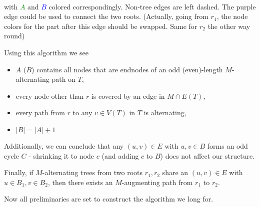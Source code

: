 \begin{example}
\begin{minipage}{\textwidth}
\begin{tikzpicture}
        \end{tikzpicture}
    \end{minipage}
    \vspace{5pt}
    \\
    with \textcolor{green}{$A$} and \textcolor{blue}{$B$} colored correspondingly.
    Non-tree edges are left dashed. The purple edge could be used to connect the two roots.
    (Actually, going from $r_1$, the node colors for the part after this edge should be swapped. Same for $r_2$ the other way round)
\end{example}
\begin{observe} Using this algorithm we see
    \begin{itemize}
        \item $A$ ($B$) contains all nodes that are endnodes of an odd (even)-length $M$-alternating path on $T$,
        \item every node other than $r$ is covered by an edge in $M \cap E(T)$,
        \item every path from $r$ to any $v \in V(T)$ in $T$ is alternating,
        \item $|B|=|A|+1$
    \end{itemize}
    Additionally, we can conclude that any $(u,v) \in E$
    with $u,v \in B$ forms an odd cycle $C$ - shrinking it to node $c$
    (and adding $c$ to $B$) does not affect our structure.

    Finally, if $M$-alternating trees from two roots $r_1, r_2$ share an $(u,v) \in E$ with
    $u \in B_1, v \in B_2$, then there exists an $M$-augmenting path from $r_1$ to $r_2$.
\end{observe}
Now all preliminaries are set to construct the algorithm we long for.

